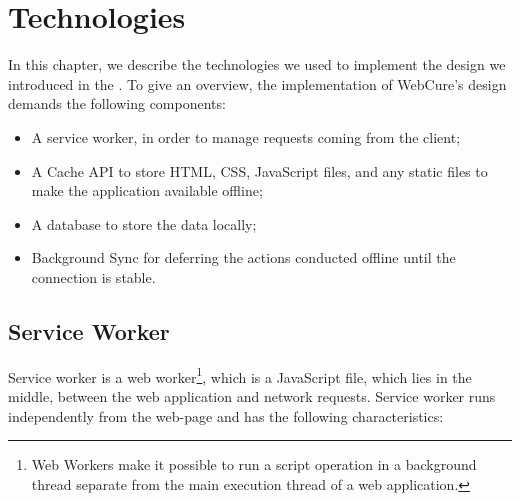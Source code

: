 \chapter{Technologies}
\label{Technologies}

In this chapter, we describe the technologies we used to implement the design we introduced in the . To give an overview, the implementation of WebCure's design demands the following components:

\begin{itemize}
\item{A service worker, in order to manage requests coming from the client;}
\item{A Cache API to store HTML, CSS, JavaScript files, and any static files\cite{41} to make the application available offline;}
\item{A database to store the data locally;}
\item{Background Sync for deferring the actions conducted offline until the connection is stable.}

\end{itemize}


\section{Service Worker}

Service worker\cite{1} is a web worker\footnote{Web Workers make it possible to run a script operation in a background thread separate from the main execution thread of a web application\cite{30}.}, which is a JavaScript file, which lies in the middle, between the web application and network requests. Service worker runs independently from the web-page and has the following characteristics: 

